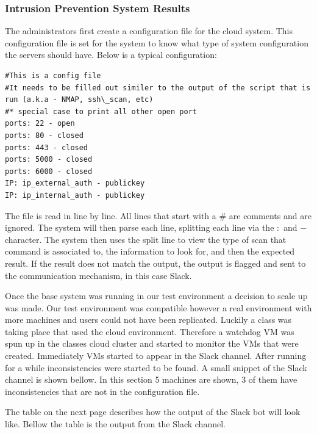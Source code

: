 \documentclass[12pt]{article}
\begin{document}
\subsubsection{Intrusion Prevention System Results}
The administrators first create a configuration file for the cloud system. This configuration file is set for the system to know what type of system configuration the servers should have. Below is a typical configuration:

\begin{mdframed}
    \begin{lstlisting}
#This is a config file
#It needs to be filled out similer to the output of the script that is run (a.k.a - NMAP, ssh\_scan, etc)
#* special case to print all other open port
ports: 22 - open
ports: 80 - closed
ports: 443 - closed
ports: 5000 - closed
ports: 6000 - closed
IP: ip_external_auth - publickey
IP: ip_internal_auth - publickey
    \end{lstlisting}
\end{mdframed}
The file is read in line by line. All lines that start with a \# are comments and are ignored. The system will then parse each line, splitting each line via the $:$ and $-$ character. The system then uses the split line to view the type of scan that command is associated to, the information to look for, and then the expected result. If the result does not match the output, the output is flagged and sent to the communication mechanism, in this case Slack.

Once the base system was running in our test environment a decision to scale up was made. Our test environment was compatible however a real environment with more machines and users could not have been replicated. Luckily a class was taking place that used the cloud environment. Therefore a watchdog VM was spun up in the classes cloud cluster and started to monitor the VMs that were created. Immediately VMs started to appear in the Slack channel. After running for a while inconsistencies were started to be found. A small snippet of the Slack channel is shown bellow. In this section 5 machines are shown, 3 of them have inconsistencies that are not in the configuration file.

The table on the next page describes how the output of the Slack bot will look like. Bellow the table is the output from the Slack channel.
\end{document}

